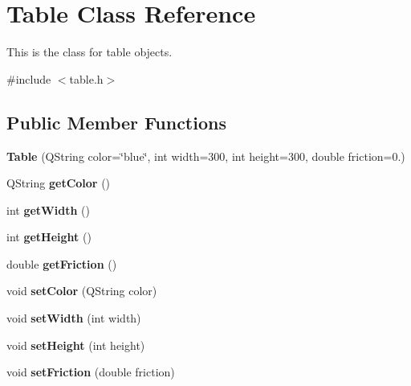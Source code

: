 \hypertarget{class_table}{}\section{Table Class Reference}
\label{class_table}


This is the class for table objects.  




{\ttfamily \#include $<$table.\+h$>$}

\subsection*{Public Member Functions}
\begin{DoxyCompactItemize}
\item 
\mbox{\label{class_table_a3c30441a9209b449178cce0e0400c4f1}} 
{\bfseries Table} (Q\+String color=\char`\"{}blue\char`\"{}, int width=300, int height=300, double friction=0.)
\item 
\mbox{\label{class_table_a5f633c6f4ba05cffe38333ef88374a8b}} 
Q\+String {\bfseries get\+Color} ()
\item 
\mbox{\label{class_table_af99d57a79ad07686c764f2fd7e016af8}} 
int {\bfseries get\+Width} ()
\item 
\mbox{\label{class_table_ac56d2b30a0bc0891cb43179fe12482f1}} 
int {\bfseries get\+Height} ()
\item 
\mbox{\label{class_table_a96e355deb9ff148fce509500df96ea6b}} 
double {\bfseries get\+Friction} ()
\item 
\mbox{\label{class_table_aa21c02cdd032e5b8904f242e03af5f0e}} 
void {\bfseries set\+Color} (Q\+String color)
\item 
\mbox{\label{class_table_ab1f18aa925da6087701458104a09a0bc}} 
void {\bfseries set\+Width} (int width)
\item 
\mbox{\label{class_table_add3f4e6e48b256ef70ca95b914185bd9}} 
void {\bfseries set\+Height} (int height)
\item 
\mbox{\label{class_table_a2f6badebd4e196c6322954c393b5e39d}} 
void {\bfseries set\+Friction} (double friction)
\end{DoxyCompactItemize}


